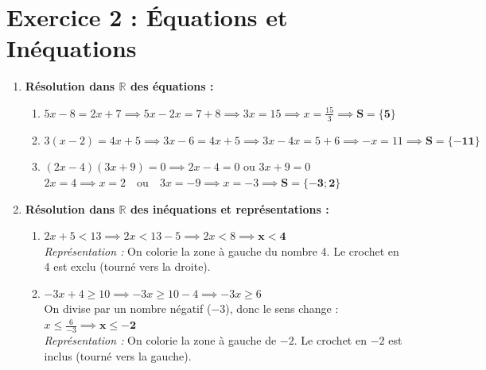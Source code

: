 \documentclass[12pt,a4paper]{article}
\begin{document}
\section*{Exercice 2 : Équations et Inéquations}
\begin{enumerate}
    \item \textbf{Résolution dans $\mathbb{R}$ des équations :}
    \begin{enumerate}
        \item $5x - 8 = 2x + 7 \implies 5x - 2x = 7 + 8 \implies 3x = 15 \implies x = \frac{15}{3} \implies \mathbf{S = \{5\}}$
        \item $3(x - 2) = 4x + 5 \implies 3x - 6 = 4x + 5 \implies 3x - 4x = 5 + 6 \implies -x = 11 \implies \mathbf{S = \{-11\}}$
        \item $(2x - 4)(3x + 9) = 0 \implies 2x - 4 = 0 \text{ ou } 3x + 9 = 0$ \\
        $2x = 4 \implies x = 2 \quad \text{ou} \quad 3x = -9 \implies x = -3 \implies \mathbf{S = \{-3 ; 2\}}$
    \end{enumerate}
    \item \textbf{Résolution dans $\mathbb{R}$ des inéquations et représentations :}
    \begin{enumerate}
        \item $2x + 5 < 13 \implies 2x < 13 - 5 \implies 2x < 8 \implies \mathbf{x < 4}$ \\
        \textit{Représentation :} On colorie la zone à gauche du nombre 4. Le crochet en 4 est exclu (tourné vers la droite).
        \item $-3x + 4 \geq 10 \implies -3x \geq 10 - 4 \implies -3x \geq 6$ \\
        On divise par un nombre négatif ($-3$), donc le sens change : $x \leq \frac{6}{-3} \implies \mathbf{x \leq -2}$ \\
        \textit{Représentation :} On colorie la zone à gauche de $-2$. Le crochet en $-2$ est inclus (tourné vers la gauche).
    \end{enumerate}
\end{enumerate}
\end{document}
